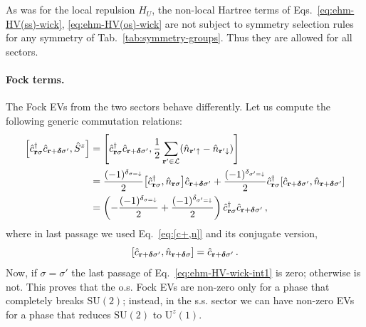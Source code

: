 As was for the local repulsion $\hat H_U$, the non-local Hartree terms of Eqs.~\eqref{eq:ehm-HV(ss)-wick}, \eqref{eq:ehm-HV(os)-wick} are not subject to symmetry selection rules for any symmetry of Tab.~\ref{tab:symmetry-groups}. Thus they are allowed for all sectors.

\paragraph{Fock terms.}

The Fock EVs from the two sectors behave differently. Let us compute the following generic commutation relations:
\begin{align}
	\comm{\hat c_{\mathbf{r}\sigma}^\dagger \hat c_{\mathbf{r}+\bm{\delta}\sigma'}}{\hat S^z} &= \comm{\hat c_{\mathbf{r}\sigma}^\dagger \hat c_{\mathbf{r}+\bm{\delta}\sigma'}}{\frac{1}{2} \sum_{\mathbf{r}'\in\mathcal{L}} (\hat n_{\mathbf{r}'\uparrow}-\hat n_{\mathbf{r}'\downarrow}) } \nonumber \\
	&= \frac{(-1)^{\delta_{\sigma=\downarrow}}}{2} \comm{\hat c_{\mathbf{r}\sigma}^\dagger}{\hat n_{\mathbf{r}\sigma}} \hat c_{\mathbf{r}+\bm{\delta}\sigma'} + \frac{(-1)^{\delta_{\sigma'=\downarrow}}}{2} \hat c_{\mathbf{r}\sigma}^\dagger \comm{\hat c_{\mathbf{r}+\bm{\delta}\sigma'}}{\hat n_{\mathbf{r}+\bm{\delta}\sigma'}} \nonumber \\
	&= \left(
		-\frac{(-1)^{\delta_{\sigma=\downarrow}}}{2} + \frac{(-1)^{\delta_{\sigma'=\downarrow}}}{2}
	\right)\hat c_{\mathbf{r}\sigma}^\dagger \hat c_{\mathbf{r}+\bm{\delta}\sigma'} \, , \label{eq:ehm-HV-wick-int1}
\end{align}
where in last passage we used Eq.~\eqref{eq:[c+,n]} and its conjugate version,
\[
	\comm{\hat c_{\mathbf{r}+\bm{\delta}\sigma'}}{\hat n_{\mathbf{r}+\bm{\delta}\sigma}} = \hat c_{\mathbf{r}+\bm{\delta}\sigma'} \, .
\]
Now, if $\sigma=\sigma'$ the last passage of Eq.~\eqref{eq:ehm-HV-wick-int1} is zero; otherwise is not. This proves that the o.s. Fock EVs are non-zero only for a phase that completely breaks $\mathrm{SU}(2)$; instead, in the s.s. sector we can have non-zero EVs for a phase that reduces $\mathrm{SU}(2)$ to $\mathrm{U}^z(1)$.

